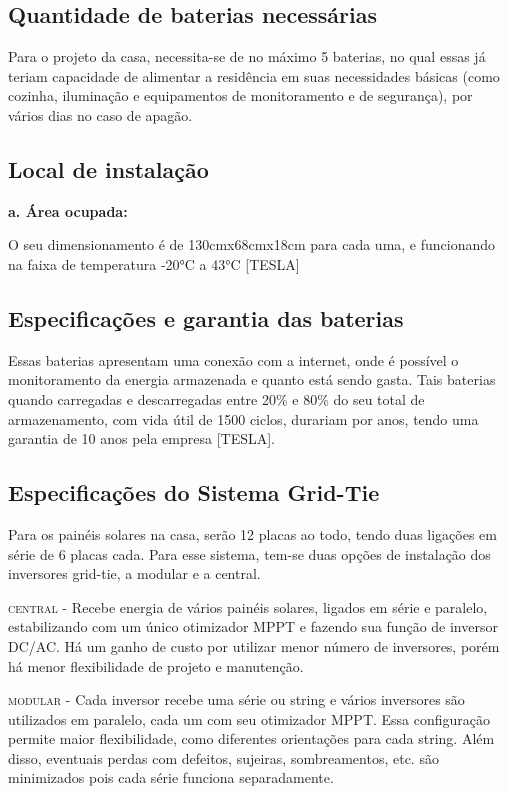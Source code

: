 \subsection{Quantidade de baterias necessárias}

	Para o projeto da casa, necessita-se de no máximo 5 baterias, no qual essas já teriam capacidade de alimentar a residência em suas necessidades básicas (como cozinha, iluminação e equipamentos de monitoramento e de segurança), por vários dias no caso de apagão.

\subsection{Local de instalação}

\textbf{a. Área ocupada:}

	O seu dimensionamento é de 130cmx68cmx18cm para cada uma, e funcionando na faixa de temperatura -20°C a 43°C [TESLA]

\subsection{Especificações e garantia das baterias}

	Essas baterias apresentam uma conexão com a internet, onde é possível o monitoramento da energia armazenada e quanto está sendo gasta. Tais baterias quando carregadas e descarregadas entre 20\% e 80\% do seu total de armazenamento, com vida útil de 1500 ciclos, durariam por anos, tendo uma garantia de 10 anos pela empresa [TESLA].

\subsection{Especificações do Sistema Grid-Tie}

	Para os painéis solares na casa, serão 12 placas ao todo, tendo duas ligações em série de 6 placas cada. Para esse sistema, tem-se duas opções de instalação dos inversores grid-tie, a modular e a central.

	\textsc{central} - Recebe energia de vários painéis solares, ligados em série e paralelo, estabilizando com um único otimizador MPPT e fazendo sua função de inversor DC/AC. Há um ganho de custo por utilizar menor número de inversores, porém há menor flexibilidade de projeto e manutenção.

	\textsc{modular} - Cada inversor recebe uma série ou string e vários inversores são utilizados em paralelo, cada um com seu otimizador MPPT. Essa configuração permite maior flexibilidade, como diferentes orientações para cada string. Além disso, eventuais perdas com defeitos, sujeiras, sombreamentos, etc. são minimizados pois cada série funciona separadamente.

